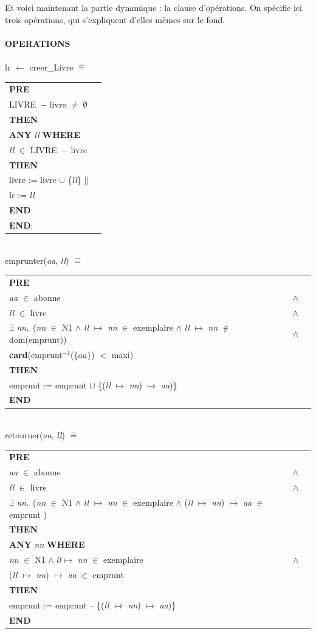\documentclass[10pt,a4paper]{article}
\newcommand{\Bequal}{\mathrel{\widehat{=}}}
\begin{document}
Et voici maintenant la partie dynamique : la clause d'opérations. On spécifie ici trois opérations, qui s'expliquent d'elles mêmes sur le fond.
\\
\\
\noindent \textbf{OPERATIONS}\\ \\
\indent lr $\leftarrow$ creer\_Livre $\Bequal$
\begin{longtable}{ll} \textbf{PRE} \tabularnewline
\indent LIVRE\ $-$ livre $\neq$ $\emptyset$ \tabularnewline
\textbf{THEN} \tabularnewline
\indent \textbf{ANY} \emph{ll} \textbf{WHERE} \tabularnewline \indent \indent \emph{ll} $\in$ LIVRE\ $-$ livre \tabularnewline
\indent \textbf{THEN} \tabularnewline
\indent \indent livre := livre $\cup$ \{\emph{ll}\} $||$ \tabularnewline
\indent \indent lr := \emph{ll} \tabularnewline
\indent \textbf{END} \tabularnewline
\textbf{END};
\end{longtable}
\ \\ 
\indent emprunter(\emph{aa}, \emph{ll}) $\Bequal$
\begin{longtable}{lll}
\textbf{PRE} \tabularnewline
\indent \emph{aa} $\in$ abonne & $\wedge$ \tabularnewline 
\indent \emph{ll} $\in$ livre & $\wedge$ \tabularnewline
\indent $\exists$ \emph{nn}.\ (\emph{nn} $\in$ N1 $\wedge$ \emph{ll} $\mapsto$ \emph{nn} $\in$ exemplaire $\wedge$ \emph{ll} $\mapsto$ \emph{nn} $\notin$ dom(emprunt)) & $\wedge$ \tabularnewline
\indent \textbf{card}(emprunt$^{-1}$($\{aa\}$) $<$ maxi) \tabularnewline
\textbf{THEN} \tabularnewline \indent emprunt := emprunt $\cup$ \{(\emph{ll} $\mapsto$ \emph{nn}) $\mapsto$ \emph{aa})\} \tabularnewline
\textbf{END} \tabularnewline
\end{longtable}
\ \\ 
\indent retourner(\emph{aa}, \emph{ll}) $\Bequal$
\begin{longtable}{lll}
\textbf{PRE} \tabularnewline
\indent \emph{aa} $\in$ abonne & $\wedge$ \tabularnewline 
\indent \emph{ll} $\in$ livre & $\wedge$ \tabularnewline
\indent $\exists$ \emph{nn}.\ (\emph{nn} $\in$ N1 $\wedge$ \emph{ll} $\mapsto$ \emph{nn} $\in$ exemplaire $\wedge$ (\emph{ll} $\mapsto$ \emph{nn}) $\mapsto$ \emph{aa} $\in$ emprunt )\tabularnewline
\textbf{THEN} \tabularnewline
\indent \textbf{ANY} \emph{nn} \textbf{WHERE} \tabularnewline
\indent \indent \emph{nn} $\in$ N1 $\wedge$ $ll \mapsto$ \emph{nn} $\in$ exemplaire & $\wedge$ \tabularnewline
\indent \indent (\emph{ll} $\mapsto$ \emph{nn}) $\mapsto$ \emph{aa} $\in$ emprunt \tabularnewline
\indent \textbf{THEN} \tabularnewline
\indent \indent emprunt := emprunt -- \{(\emph{ll} $\mapsto$ \emph{nn}) $\mapsto$ \emph{aa})\} \tabularnewline
\textbf{END} \tabularnewline
\end{longtable}
\end{document}

